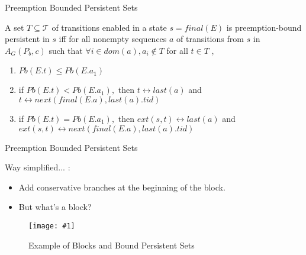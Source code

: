 \documentclass[9pt]{beamer}
\newcommand{\trace}[2]{
\begin{figure}[H]
\centering
\texttt{[image: \#1]}
\caption{#2}
\label{#2}
\end{figure}
}
\begin{document}
\begin{frame}{Preemption Bounded Persistent Sets}

\begin{definition}

A set $T \subseteq \mathcal{T}$ of transitions enabled in a state $s=final(E)$
is preemption-bound persistent in $s$ iff for all nonempty
sequences $a$ of transitions from $s$ in $A_G(P_b,c)$ such that
$\forall i \in dom(a), a_i \notin T$ for all $t \in T$ ,

\begin{enumerate}
\item $Pb(E.t) \leq Pb(E.a_1)$
\item if $Pb(E.t)<Pb(E.a_{1}) ,$ then $t \leftrightarrow last(a)$ and $t \leftrightarrow  next(final(E.a), last(a).tid)$
\item if $Pb(E.t)=Pb(E.a_{1}),$ then $ext(s,t) \leftrightarrow last(a)$ and $ext(s,t) \leftrightarrow next(final(E.a), last(a).tid)$
\end{enumerate}

\end{definition}
    
\end{frame}

\begin{frame}{Preemption Bounded Persistent Sets}

Way simplified... :

\begin{itemize}[<+->]
   \item Add conservative branches at the beginning of the block.
   \item But what's a block?
\end{itemize}
   \pause
   \trace{../img/bound-persistent-blocks.pdf}{Example of Blocks and Bound Persistent Sets}
\end{frame}
\end{document}
